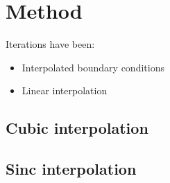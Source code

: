 \section{Method}
Iterations have been:
\begin{itemize}
    \item Interpolated boundary conditions
    \item Linear interpolation
\end{itemize}

\subsection{Cubic interpolation}

\subsection{Sinc interpolation}